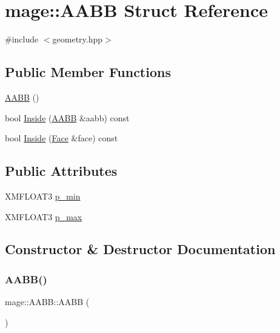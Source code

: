 \hypertarget{structmage_1_1_a_a_b_b}{}\section{mage\+:\+:A\+A\+BB Struct Reference}
\label{structmage_1_1_a_a_b_b}


{\ttfamily \#include $<$geometry.\+hpp$>$}

\subsection*{Public Member Functions}
\begin{DoxyCompactItemize}
\item 
\hyperlink{structmage_1_1_a_a_b_b_ae6db94dcb9165eb008f0be8741f0eb62}{A\+A\+BB} ()
\item 
bool \hyperlink{structmage_1_1_a_a_b_b_ad1c2ec1aab58a383219ba1082e72b020}{Inside} (\hyperlink{structmage_1_1_a_a_b_b}{A\+A\+BB} \&aabb) const
\item 
bool \hyperlink{structmage_1_1_a_a_b_b_ad8b5d30287d5dcb98ad2dfcfb90c5e22}{Inside} (\hyperlink{structmage_1_1_face}{Face} \&face) const
\end{DoxyCompactItemize}
\subsection*{Public Attributes}
\begin{DoxyCompactItemize}
\item 
X\+M\+F\+L\+O\+A\+T3 \hyperlink{structmage_1_1_a_a_b_b_aca78eb314738b73f2d21dcf75130b6eb}{p\+\_\+min}
\item 
X\+M\+F\+L\+O\+A\+T3 \hyperlink{structmage_1_1_a_a_b_b_aa5c60af6413a01158acd81d67ebe828c}{p\+\_\+max}
\end{DoxyCompactItemize}


\subsection{Constructor \& Destructor Documentation}
\hypertarget{structmage_1_1_a_a_b_b_ae6db94dcb9165eb008f0be8741f0eb62}{}\label{structmage_1_1_a_a_b_b_ae6db94dcb9165eb008f0be8741f0eb62} 
\subsubsection{\texorpdfstring{A\+A\+B\+B()}{AABB()}}
{\footnotesize\ttfamily mage\+::\+A\+A\+B\+B\+::\+A\+A\+BB (\begin{DoxyParamCaption}{ }\end{DoxyParamCaption})}



